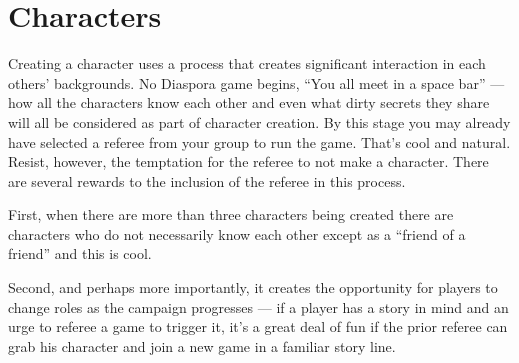 \chapter{Characters}
\label{cha:characters}

Creating a character uses a process that creates significant interaction in each others' backgrounds. No Diaspora game begins, ``You all meet in a space bar'' --- how all the characters know each other and even what dirty secrets they share will all be considered as part of character creation. By this stage you may already have selected a referee from your group to run the game. That's cool and natural. Resist, however, the temptation for the referee to not make a character. There are several rewards to the inclusion of the referee in this process.

First, when there are more than three characters being created there are characters who do not necessarily know each other except as a ``friend of a friend'' and this is cool.

Second, and perhaps more importantly, it creates the opportunity for players to change roles as the campaign progresses --- if a player has a story in mind and an urge to referee a game to trigger it, it's a great deal of fun if the prior referee can grab his character and join a new game in a familiar story line.







